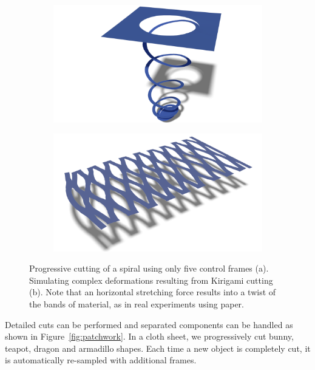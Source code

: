 \begin{figure}[!h]
	\centering
	\begin{subfigure}[b]{0.45\linewidth}
		\includegraphics[width=\linewidth]{images/cutting-mig2015/Spiral2.pdf}
		\caption{\label{fig:spiral}}
	\end{subfigure}
	\hfill
	\begin{subfigure}[b]{0.45\linewidth}
		\includegraphics[width=\linewidth]{images/cutting-mig2015/Kirigami.pdf}
		\caption{\label{fig:kirigami}}
	\end{subfigure}
	\caption[Frame-based cutting: Spiral and Kirigami cutting examples]{\label{fig:Cutting_Teaser} Progressive cutting of a spiral using only five control frames (a). Simulating complex deformations resulting from Kirigami cutting (b). Note that an horizontal stretching force results into a twist of the bands of material, as in real experiments using paper.}
\end{figure}

Detailed cuts can be performed and separated components can be handled as shown in Figure~\ref{fig:patchwork}. In a cloth sheet, we progressively cut bunny, teapot, dragon and armadillo shapes. Each time a new object is completely cut, it is automatically re-sampled with additional frames.

